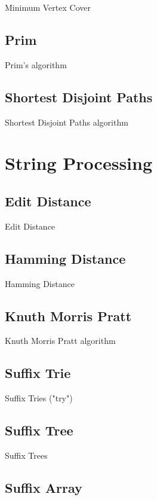 \documentclass[10pt,oneside]{memoir}
\begin{document}
    Minimum Vertex Cover

    \section{Prim}

    Prim's algorithm

    \section{Shortest Disjoint Paths}

    Shortest Disjoint Paths algorithm



\chapter{String Processing}

    \section{Edit Distance}

    Edit Distance

    \section{Hamming Distance}

    Hamming Distance

    \section{Knuth Morris Pratt}

    Knuth Morris Pratt algorithm

    \section{Suffix Trie}

    Suffix Tries ("try")

    \section{Suffix Tree}

    Suffix Trees

    \section{Suffix Array}
\end{document}

